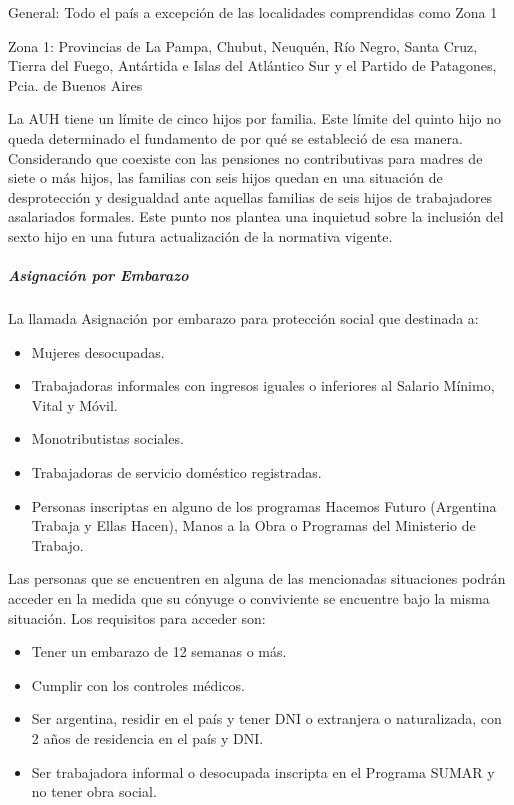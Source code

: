 \documentclass[
  12,
]{article}
\begin{document}
General: Todo el país a excepción de las localidades comprendidas como
Zona 1

Zona 1: Provincias de La Pampa, Chubut, Neuquén, Río Negro, Santa Cruz,
Tierra del Fuego, Antártida e Islas del Atlántico Sur y el Partido de
Patagones, Pcia. de Buenos Aires

La AUH tiene un límite de cinco hijos por familia. Este límite del
quinto hijo no queda determinado el fundamento de por qué se estableció
de esa manera. Considerando que coexiste con las pensiones no
contributivas para madres de siete o más hijos, las familias con seis
hijos quedan en una situación de desprotección y desigualdad ante
aquellas familias de seis hijos de trabajadores asalariados formales.
Este punto nos plantea una inquietud sobre la inclusión del sexto hijo
en una futura actualización de la normativa vigente.

\hypertarget{asignaciuxf3n-por-embarazo}{%
\subparagraph{Asignación por
Embarazo}\label{asignaciuxf3n-por-embarazo}}

La llamada Asignación por embarazo para protección social que destinada
a:

\begin{itemize}
\item
  Mujeres desocupadas.
\item
  Trabajadoras informales con ingresos iguales o inferiores al Salario
  Mínimo, Vital y Móvil.
\item
  Monotributistas sociales.
\item
  Trabajadoras de servicio doméstico registradas.
\item
  Personas inscriptas en alguno de los programas Hacemos Futuro
  (Argentina Trabaja y Ellas Hacen), Manos a la Obra o Programas del
  Ministerio de Trabajo.
\end{itemize}

Las personas que se encuentren en alguna de las mencionadas situaciones
podrán acceder en la medida que su cónyuge o conviviente se encuentre
bajo la misma situación. Los requisitos para acceder son:

\begin{itemize}
\item
  Tener un embarazo de 12 semanas o más.
\item
  Cumplir con los controles médicos.
\item
  Ser argentina, residir en el país y tener DNI o extranjera o
  naturalizada, con 2 años de residencia en el país y DNI.
\item
  Ser trabajadora informal o desocupada inscripta en el Programa SUMAR y
  no tener obra social.
\end{itemize}
\end{document}
